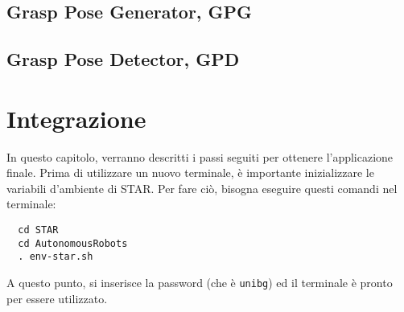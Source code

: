 \documentclass{report}
\begin{document}
\section{Grasp Pose Generator, GPG}\label{GPG}
\section{Grasp Pose Detector, GPD}\label{GPD}

\newpage
\chapter{Integrazione}\label{integrazione}
In questo capitolo, verranno descritti i passi seguiti per ottenere l'applicazione finale. Prima di utilizzare un nuovo terminale, è importante inizializzare le variabili d'ambiente di STAR. Per fare ciò, bisogna eseguire questi comandi nel terminale:
\begin{verbatim}
  cd STAR
  cd AutonomousRobots
  . env-star.sh
\end{verbatim}
A questo punto, si inserisce la password (che è \texttt{unibg}) ed il terminale è pronto per essere utilizzato. 
\end{document}
